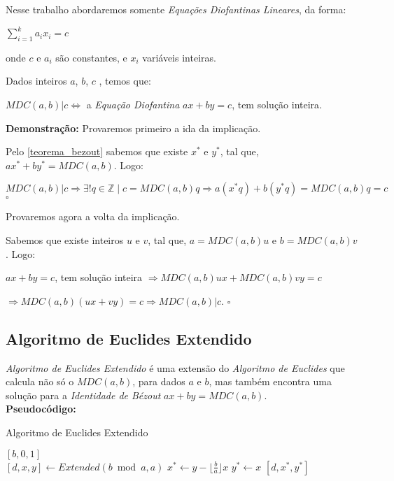 Nesse trabalho abordaremos somente \textit{Equações Diofantinas Lineares}, da forma:

$\sum_{i=1}^{k}a_i x_i = c$

onde $c$ e $a_i$ são constantes, e $x_i$ variáveis inteiras.\\


\begin{theorem}\label{equacao_diofantina_implicacao}
Dados inteiros $a$, $b$, $c$ , temos que:

$MDC(a,b)|c \Leftrightarrow$ a \textit{Equação Diofantina} $ax + by=c$, tem solução inteira.
\end{theorem}
\textbf{Demonstração:}
Provaremos primeiro a ida da implicação.

Pelo \autoref{teorema_bezout} sabemos que existe $x^*$ e $y^*$, tal que, $ax^* + by^* = MDC(a,b)$. Logo:

$MDC(a,b)|c \Rightarrow \exists! q\in\mathbb{Z} \mid c = MDC(a,b)q \Rightarrow a(x^*q) + b(y^*q) = MDC(a,b)q = c$ $\square$

Provaremos agora a volta da implicação.

Sabemos que existe inteiros $u$ e $v$, tal que, $a=MDC(a,b)u$ e $b=MDC(a,b)v$. Logo:

$ax + by=c$, tem solução inteira $\Rightarrow MDC(a,b)ux + MDC(a,b)vy = c$

$\Rightarrow MDC(a,b)(ux + vy) = c \Rightarrow MDC(a,b)|c$. $\square$ 



\subsection{Algoritmo de Euclides Extendido}

\textit{Algoritmo de Euclides Extendido} é uma extensão do \textit{Algoritmo de Euclides} que calcula não só o $MDC(a,b)$, para dados $a$ e $b$, mas também encontra
uma solução para a \textit{Identidade de Bézout} $ax+by = MDC(a,b)$. 
\\

\textbf{Pseudocódigo:}
\begin{algorithm}
\caption{Algoritmo de Euclides Extendido}\label{mdc_extended}
\begin{algorithmic}[1]
\State \Return $[b,0,1]$
\EndIf
\\
\State $[d,x,y] \gets Extended(b \bmod a, a)$
\State $x^* \gets y - \lfloor \frac{b}{a} \rfloor x$
\State $y^* \gets x$
\State \Return $[d,x^*,y^*]$
\EndProcedure
\end{algorithmic}
\end{algorithm}

